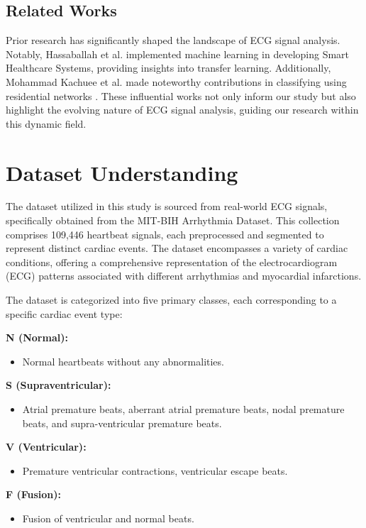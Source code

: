 \documentclass[]{acmsiggraph}
\begin{document}
\subsection{Related Works}
Prior research has significantly shaped the landscape of ECG signal analysis. Notably, Hassaballah et al. \cite{hassaballah2023} implemented machine learning in developing Smart Healthcare Systems, providing insights into transfer learning. Additionally, Mohammad Kachuee et al. made noteworthy contributions in classifying using residential networks \cite{kachuee2018}. These influential works not only inform our study but also highlight the evolving nature of ECG signal analysis, guiding our research within this dynamic field.

\section{Dataset Understanding}
The dataset utilized in this study is sourced from real-world ECG signals, specifically obtained from the MIT-BIH Arrhythmia Dataset. This collection comprises 109,446 heartbeat signals, each preprocessed and segmented to represent distinct cardiac events. The dataset encompasses a variety of cardiac conditions, offering a comprehensive representation of the electrocardiogram (ECG) patterns associated with different arrhythmias and myocardial infarctions.

The dataset is categorized into five primary classes, each corresponding to a specific cardiac event type:

\textbf{N (Normal):}
\begin{itemize}
    \item Normal heartbeats without any abnormalities.
\end{itemize}

\textbf{S (Supraventricular):}
\begin{itemize}
    \item Atrial premature beats, aberrant atrial premature beats, nodal premature beats, and supra-ventricular premature beats.
\end{itemize}

\textbf{V (Ventricular):}
\begin{itemize}
    \item Premature ventricular contractions, ventricular escape beats.
\end{itemize}

\textbf{F (Fusion):}
\begin{itemize}
    \item Fusion of ventricular and normal beats.
\end{itemize}
\end{document}
